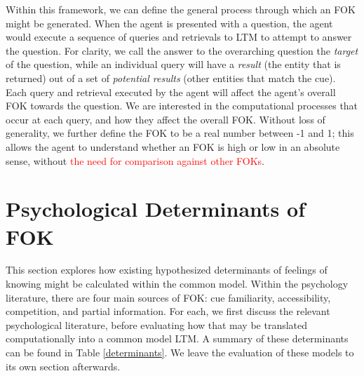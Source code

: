 \documentclass[10pt,letterpaper]{article}
\newcommand{\fixme}[2][]{#2}
\renewcommand{\fixme}[2][]{\textcolor{red}{#2}}
\begin{document}
Within this framework, we can define the general process through which an FOK might be generated.
When the agent is presented with a question, the agent would execute a sequence of queries and retrievals to LTM to attempt to answer the question.
For clarity, we call the answer to the overarching question the \emph{target} of the question, while an individual query will have a \emph{result} (the entity that is returned) out of a set of \emph{potential results} (other entities that match the cue).
Each query and retrieval executed by the agent will affect the agent's overall FOK towards the question.
We are interested in the computational processes that occur at each query, and how they affect the overall FOK.
Without loss of generality, we further define the FOK to be a real number between -1 and 1; this allows the agent to understand whether an FOK is high or low in an absolute sense, without \fixme[I'm not sure how that would work]{the need for comparison against other FOKs}.


\section{Psychological Determinants of FOK}

This section explores how existing hypothesized determinants of feelings of knowing might be calculated within the common model.
Within the psychology literature, there are four main sources of FOK: cue familiarity, accessibility, competition, and partial information.
For each, we first discuss the relevant psychological literature, before evaluating how that may be translated computationally into a common model LTM.
A summary of these determinants can be found in Table \ref{determinants}.
We leave the evaluation of these models to its own section afterwards.
\end{document}
